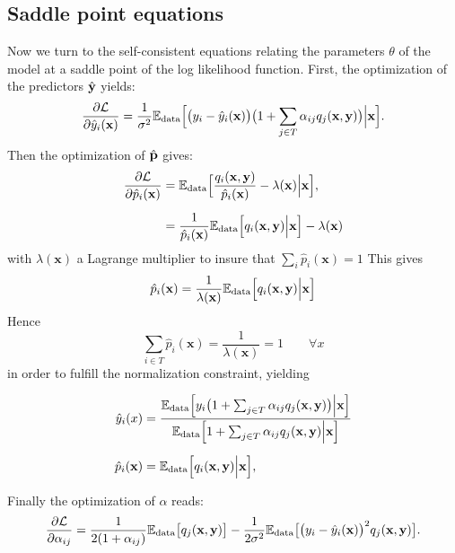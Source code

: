 \subsection{Saddle point equations}
Now we turn to the self-consistent equations relating the parameters $\theta$ 
of the model at a saddle point of the log likelihood function. First, the 
optimization of the predictors $\hat {\bf y}$ yields:
\[
\frac{\partial{\cal L}}{\partial \hat y_i(\mathbf{x})} = \frac{1}{\sigma^2}{\mathbb E}_{\rm data}\Bigl[ \bigl(y_i-\hat y_i(\mathbf{x})\bigr)\bigl(1+\sum_{j\in  T}\alpha_{ij}q_j(\mathbf{x},{\bf y})\bigr)\Big\vert \mathbf{x}\Bigr].
\]
Then the optimization of $\hat{\bf p}$ gives:
\begin{align*}
\frac{\partial{\cal L}}{\partial \hat p_i(\mathbf{x})} &= {\mathbb E}_{\rm data}\Bigl[\frac{q_i(\mathbf{x},{\bf y})}{\hat p_i(\mathbf{x})}-\lambda(\mathbf{x})\Big\vert \mathbf{x} \Bigr],\\[0.2cm]
&= \frac{1}{\hat p_i(\mathbf{x})}{\mathbb E}_{\rm data}\Bigl[q_i(\mathbf{x},{\bf y})\Big\vert \mathbf{x} \Bigr]-\lambda(\mathbf{x})
\end{align*}
with $\lambda(\mathbf{x})$ a Lagrange multiplier to insure that $\sum_i\hat p_i(\mathbf{x})=1$ 
This gives
\[
\hat p_i(\mathbf{x}) = \frac{1}{\lambda(\mathbf{x})}{\mathbb E}_{\rm data}
\Bigl[q_i(\mathbf{x},{\bf y})\Big\vert \mathbf{x} \Bigr]
\]
Hence
\[
\sum_{i\in T} \hat p_i(\mathbf{x}) = \frac{1}{\lambda(\mathbf{x})} = 1\qquad \forall x
\]
in order to fulfill the normalization constraint, yielding 

\begin{align}
  \hat y_i(x) &= 
    \frac{
      {\mathbb E}_{\rm data} \Bigl[
          y_i\bigl(1+\sum_{j\in T}\alpha_{ij}q_j(\mathbf{x},{\bf y})\bigr)\Big\vert \mathbf{x}
        \Bigr]
    }{
      {\mathbb E}_{\rm data}\Bigl[1+\sum_{j\in T}\alpha_{ij}q_j(\mathbf{x},{\bf y})\Big\vert \mathbf{x}\Bigr]
    }\label{eq:hyopt}\\[0.2cm]
  \hat p_i(\mathbf{x}) &= {\mathbb E}_{\rm data}\Bigl[q_i(\mathbf{x},{\bf y})\Big\vert \mathbf{x} \Bigr],\label{eq:tildep}
\end{align}

Finally the optimization of $\alpha$ reads:
\[
\frac{\partial{\cal L}}{\partial \alpha_{ij}} = \frac{1}{2(1+\alpha_{ij})}{\mathbb E}_{\rm data}\bigl[q_j(\mathbf{x},{\bf y})\bigr]-\frac{1}{2\sigma^2}
{\mathbb E}_{\rm data}\bigl[\bigl(y_i-\hat y_i(\mathbf{x})\bigr)^2q_j(\mathbf{x},{\bf y})\bigr].
\]
